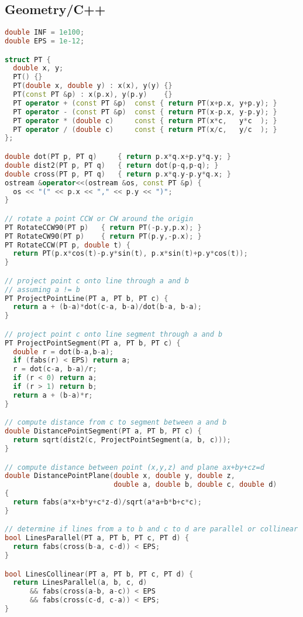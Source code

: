 \subsection{Geometry/C++}
\begin{lstlisting}[language=C++]
double INF = 1e100;
double EPS = 1e-12;

struct PT { 
  double x, y; 
  PT() {}
  PT(double x, double y) : x(x), y(y) {}
  PT(const PT &p) : x(p.x), y(p.y)    {}
  PT operator + (const PT &p)  const { return PT(x+p.x, y+p.y); }
  PT operator - (const PT &p)  const { return PT(x-p.x, y-p.y); }
  PT operator * (double c)     const { return PT(x*c,   y*c  ); }
  PT operator / (double c)     const { return PT(x/c,   y/c  ); }
};

double dot(PT p, PT q)     { return p.x*q.x+p.y*q.y; }
double dist2(PT p, PT q)   { return dot(p-q,p-q); }
double cross(PT p, PT q)   { return p.x*q.y-p.y*q.x; }
ostream &operator<<(ostream &os, const PT &p) {
  os << "(" << p.x << "," << p.y << ")"; 
}

// rotate a point CCW or CW around the origin
PT RotateCCW90(PT p)   { return PT(-p.y,p.x); }
PT RotateCW90(PT p)    { return PT(p.y,-p.x); }
PT RotateCCW(PT p, double t) { 
  return PT(p.x*cos(t)-p.y*sin(t), p.x*sin(t)+p.y*cos(t)); 
}

// project point c onto line through a and b
// assuming a != b
PT ProjectPointLine(PT a, PT b, PT c) {
  return a + (b-a)*dot(c-a, b-a)/dot(b-a, b-a);
}

// project point c onto line segment through a and b
PT ProjectPointSegment(PT a, PT b, PT c) {
  double r = dot(b-a,b-a);
  if (fabs(r) < EPS) return a;
  r = dot(c-a, b-a)/r;
  if (r < 0) return a;
  if (r > 1) return b;
  return a + (b-a)*r;
}

// compute distance from c to segment between a and b
double DistancePointSegment(PT a, PT b, PT c) {
  return sqrt(dist2(c, ProjectPointSegment(a, b, c)));
}

// compute distance between point (x,y,z) and plane ax+by+cz=d
double DistancePointPlane(double x, double y, double z,
                          double a, double b, double c, double d)
{
  return fabs(a*x+b*y+c*z-d)/sqrt(a*a+b*b+c*c);
}

// determine if lines from a to b and c to d are parallel or collinear
bool LinesParallel(PT a, PT b, PT c, PT d) { 
  return fabs(cross(b-a, c-d)) < EPS; 
}

bool LinesCollinear(PT a, PT b, PT c, PT d) { 
  return LinesParallel(a, b, c, d)
      && fabs(cross(a-b, a-c)) < EPS
      && fabs(cross(c-d, c-a)) < EPS; 
}


\end{lstlisting}
